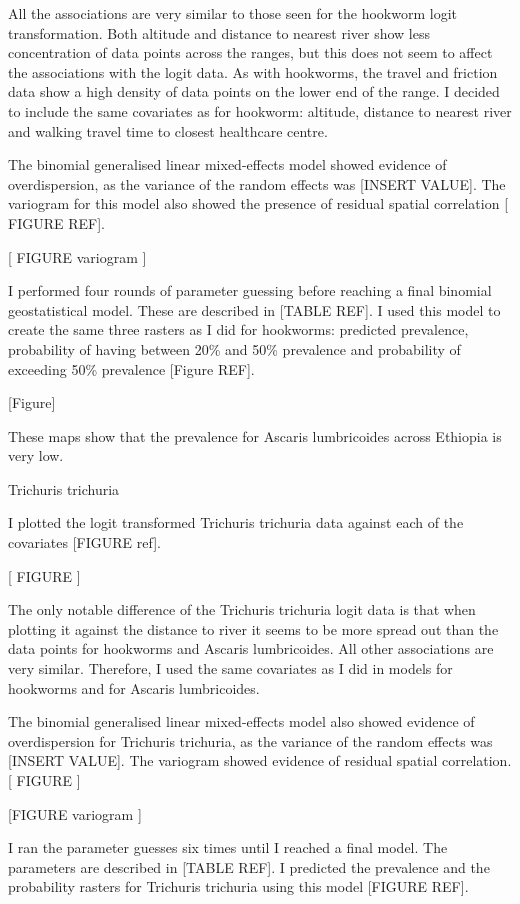 \documentclass[
]{article}
\begin{document}
All the associations are very similar to those seen for the hookworm
logit transformation. Both altitude and distance to nearest river show
less concentration of data points across the ranges, but this does not
seem to affect the associations with the logit data. As with hookworms,
the travel and friction data show a high density of data points on the
lower end of the range. I decided to include the same covariates as for
hookworm: altitude, distance to nearest river and walking travel time to
closest healthcare centre.

The binomial generalised linear mixed-effects model showed evidence of
overdispersion, as the variance of the random effects was {[}INSERT
VALUE{]}. The variogram for this model also showed the presence of
residual spatial correlation {[} FIGURE REF{]}.

{[} FIGURE variogram {]}

I performed four rounds of parameter guessing before reaching a final
binomial geostatistical model. These are described in {[}TABLE REF{]}. I
used this model to create the same three rasters as I did for hookworms:
predicted prevalence, probability of having between 20\% and 50\%
prevalence and probability of exceeding 50\% prevalence {[}Figure
REF{]}.

{[}Figure{]}

These maps show that the prevalence for Ascaris lumbricoides across
Ethiopia is very low.

Trichuris trichuria

I plotted the logit transformed Trichuris trichuria data against each of
the covariates {[}FIGURE ref{]}.

{[} FIGURE {]}

The only notable difference of the Trichuris trichuria logit data is
that when plotting it against the distance to river it seems to be more
spread out than the data points for hookworms and Ascaris lumbricoides.
All other associations are very similar. Therefore, I used the same
covariates as I did in models for hookworms and for Ascaris
lumbricoides.

The binomial generalised linear mixed-effects model also showed evidence
of overdispersion for Trichuris trichuria, as the variance of the random
effects was {[}INSERT VALUE{]}. The variogram showed evidence of
residual spatial correlation. {[} FIGURE {]}

{[}FIGURE variogram {]}

I ran the parameter guesses six times until I reached a final model. The
parameters are described in {[}TABLE REF{]}. I predicted the prevalence
and the probability rasters for Trichuris trichuria using this model
{[}FIGURE REF{]}.
\end{document}
